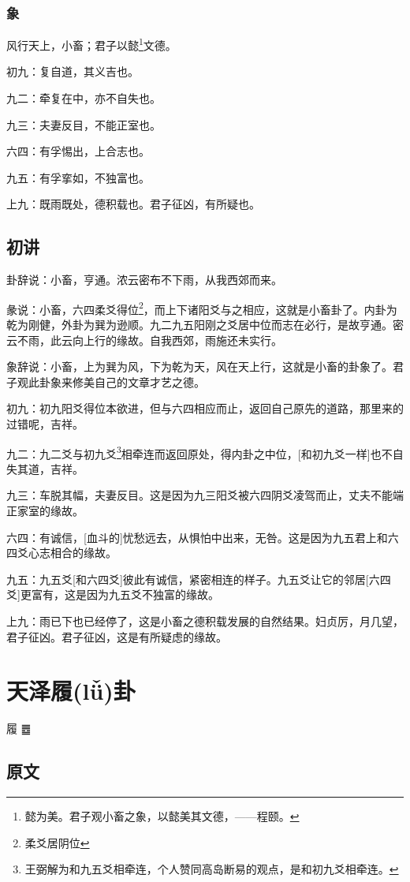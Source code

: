 \documentclass[12pt,oneside]{book}
\begin{document}
\subsection{象}
风行天上，小畜；君子以懿\footnote{懿为美。君子观小畜之象，以懿美其文德，——程颐。}文德。

初九：复自道，其义吉也。

九二：牵复在中，亦不自失也。

九三：夫妻反目，不能正室也。

六四：有孚惕出，上合志也。

九五：有孚挛如，不独富也。

上九：既雨既处，德积载也。君子征凶，有所疑也。


\section{初讲}
卦辞说：小畜，亨通。浓云密布不下雨，从我西郊而来。

彖说：小畜，六四柔爻得位\footnote{柔爻居阴位}，而上下诸阳爻与之相应，这就是小畜卦了。内卦为乾为刚健，外卦为巽为逊顺。九二九五阳刚之爻居中位而志在必行，是故亨通。密云不雨，此云向上行的缘故。自我西郊，雨施还未实行。

象辞说：小畜，上为巽为风，下为乾为天，风在天上行，这就是小畜的卦象了。君子观此卦象来修美自己的文章才艺之德。

初九：初九阳爻得位本欲进，但与六四相应而止，返回自己原先的道路，那里来的过错呢，吉祥。

九二：九二爻与初九爻\footnote{王弼解为和九五爻相牵连，个人赞同高岛断易的观点，是和初九爻相牵连。}相牵连而返回原处，得内卦之中位，[和初九爻一样]也不自失其道，吉祥。

九三：车脱其幅，夫妻反目。这是因为九三阳爻被六四阴爻凌驾而止，丈夫不能端正家室的缘故。

六四：有诚信，[血斗的]忧愁远去，从惧怕中出来，无咎。这是因为九五君上和六四爻心志相合的缘故。

九五：九五爻[和六四爻]彼此有诚信，紧密相连的样子。九五爻让它的邻居[六四爻]更富有，这是因为九五爻不独富的缘故。

上九：雨已下也已经停了，这是小畜之德积载发展的自然结果。妇贞厉，月几望，君子征凶。君子征凶，这是有所疑虑的缘故。


\chapter{天泽履(lǚ)卦}
履 {\Large ䷉}

\section{原文}
\end{document}
